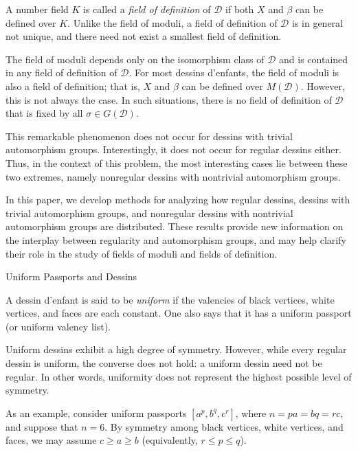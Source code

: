 \documentclass[12pt,reqno]{amsart}
\makeatletter
\newif\if@noindentafterheading
\renewcommand\subsection{\@startsection{subsection}{2}{\z@}%
  {-2.5ex \@plus -.3ex \@minus -.2ex}%
  {1.5ex \@plus .2ex}%
  {\normalfont\bfseries}%
}
\let\orig@subsection\subsection
\renewcommand\subsection{%
  \@ifstar{\subsection@star}{\subsection@nostar}%
}
\newcommand\subsection@nostar{%
  \@ifnextchar[{\subsection@opt}{\subsection@noopt}%
}
\newcommand\subsection@opt[2][]{%
  \global\@noindentafterheadingtrue
  \orig@subsection[#1]{#2}%
  \global\@noindentafterheadingfalse
}
\newcommand\subsection@noopt[1]{%
  \global\@noindentafterheadingtrue
  \orig@subsection{#1}%
  \global\@noindentafterheadingfalse
}
\newcommand\subsection@star[1]{%
  \global\@noindentafterheadingtrue
  \orig@subsection*{#1}%
  \global\@noindentafterheadingfalse
}
\newcommand{\msD}{\mathscr{D}}
\newcommand{\B}{\beta}									%
\theoremstyle{mythmstyle}
\theoremstyle{mydefstyle}
\newcommand{\dde}{dessin d'enfant\xspace}
\newcommand{\ddes}{dessins d'enfants\xspace}
\numberwithin{equation}{section}
\makeatother
\begin{document}
A number field $K$ is called a \emph{field of definition} of $\msD$ if both $X$ and $\B$ can be defined over $K$.
Unlike the field of moduli, a field of definition of $\msD$ is in general not unique,  and there need not exist
a smallest field of definition.

The field of moduli depends only on the isomorphism class of $\msD$ and is contained in any field of definition of $\msD$.
For most \ddes, the field of moduli is also a field of definition; that is, $X$ and $\B$ can be defined over $M(\msD)$.
However, this is not always the case.
In such situations, there is no field of definition of $\msD$ that is fixed by all $\sigma \in G(\msD)$.

This remarkable phenomenon does not occur for dessins with trivial automorphism groups. Interestingly, it does not
occur for regular dessins either. Thus, in the context of this problem, the most interesting cases lie between these
two extremes, namely nonregular dessins with nontrivial automorphism groups.

In this paper, we develop methods for analyzing how regular dessins, dessins with trivial automorphism groups,
and nonregular dessins with nontrivial automorphism groups are distributed. These results provide new information
on the interplay between regularity and automorphism groups, and may help clarify their role in the study of fields of
moduli and fields of definition.

\subsection{Uniform Passports and Dessins}

\label{sec:uniform}
A \dde is said to be \emph{uniform} if the valencies of black vertices, white vertices, and faces are each constant.
One also says that it has a uniform passport (or uniform valency list).

Uniform dessins exhibit a high degree of symmetry. However, while every regular dessin is uniform, the converse does not hold: a uniform dessin need not be regular. In other words, uniformity does not represent the highest possible level of symmetry.

As an example, consider uniform passports $[a^{p}, b^{q}, c^{r}]$, where $n = pa = bq = rc$, and suppose that $n = 6$.
By symmetry among black vertices, white vertices, and faces, we may assume $c \ge a \ge b$ (equivalently, $r \le p \le q$).
\end{document}
